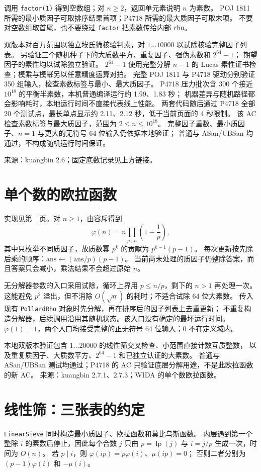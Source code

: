 调用 \texttt{factor(1)} 得到空数组；对 $n\ge2$，返回单元素说明 $n$ 为素数。
POJ 1811 所需的最小质因子可取排序结果首项；P4718 所需的最大质因子可取末项。
不要对空数组取首尾，也不要绕过 \texttt{factor} 把素数传给内部 \texttt{rho}。

双版本对百万范围以独立埃氏筛核验判素，对 $1\ldots10000$ 以试除核验完整因子列表。
另验证三个随机种子下的大质数平方、重复因子、强伪素数和 $2^{64}-1$；
期望因子的素性均以试除独立验证。
$2^{61}-1$ 使用完整分解 $n-1$ 的 Lucas 素性证书检查；模乘与模幂另以任意精度运算对拍。
完整 POJ 1811 与 P4718 驱动分别验证 350 组输入，检查素数标签与最小、最大质因子。
P4718 压力批次含 300 个接近 $10^{18}$ 的平衡半素数，本机普通编译运行约 1.99、1.83 秒；
机器差异与随机路径都会影响耗时，本地运行时间不直接代表线上性能。
两套代码随后通过 P4718 全部 20 个测试点，最长单点显示约 2.11、2.12 秒，低于当前页面的 4 秒限制。
该 AC 检查素数标签与最大质因子，范围为 $2\le n\le10^{18}$。
完整因子重数、最小质因子、$n=1$ 与更大的无符号 64 位输入仍依据本地验证；
普通与 ASan/UBSan 均通过，不构成随机运行时间保证。

来源：kuangbin 2.6；固定底数记录见上方链接。

\section{单个数的欧拉函数}\label{knowledge-phi-single}
实现见第~\pageref{compact-euler_phi}~页。对 $n\ge1$，由容斥得到
\[
\varphi(n)=n\prod_{p\mid n}\left(1-\frac1p\right),
\]
其中只枚举不同质因子，故质数幂 $p^k$ 的贡献为 $p^{k-1}(p-1)$。
每次更新按先除后乘的顺序：$\mathrm{ans}\gets(\mathrm{ans}/p)(p-1)$。
当前尚未处理的质因子仍整除答案，而且答案只会减小，乘法结果不会超过原始 $n$。

无分解器参数的入口采用试除，循环上界用 $p\le n/p$，剩下的 $n>1$ 再处理一次。
这能避免 $p^2$ 溢出，但不消除 $O(\sqrt n)$ 的耗时；不适合试除 64 位大素数。
传入现有 \texttt{PollardRho} 对象时先分解，再在排序后的因子列表上去重更新；
不重复构造分解器，后续调用沿用其随机状态。该入口没有确定的最坏运行时间。
$\varphi(1)=1$，两个入口均接受完整的正无符号 64 位输入；0 不在定义域内。

本地双版本验证包含 $1\ldots20000$ 的线性筛交叉检查、小范围直接计数互质整数，
以及重复质因子、大质数平方、$2^{64}-1$ 和已独立认证的大素数。
普通与 ASan/UBSan 测试均通过；P4718 的 AC 只验证底层分解用途，不是此欧拉函数的新 AC。
来源：kuangbin 2.7.1、2.7.3；WIDA 的单个数欧拉函数。

\section{线性筛：三张表的约定}\label{knowledge-linear-sieve}
\texttt{LinearSieve} 同时构造最小质因子、欧拉函数和莫比乌斯函数。
内层遇到第一个整除 $i$ 的素数后停止，因此每个合数 $j$ 只由
$p=\operatorname{lp}(j)$ 与 $i=j/p$ 生成一次，时间为 $O(n)$。
若 $p\mid i$，则 $\varphi(ip)=p\varphi(i)$、$\mu(ip)=0$；
否则二者分别为 $(p-1)\varphi(i)$ 和 $-\mu(i)$。

